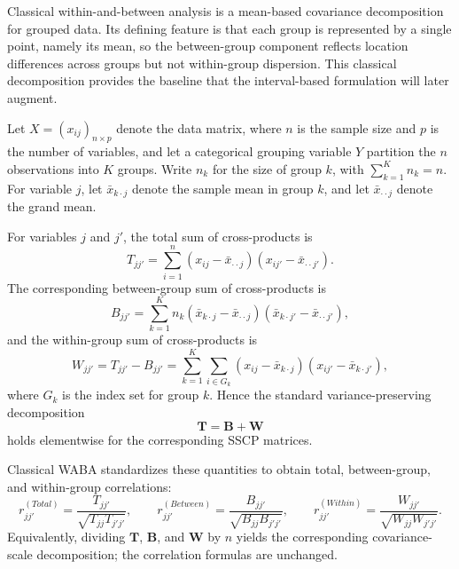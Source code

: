 \documentclass[preprint, times, 12pt, authoryear]{elsarticle}
\begin{document}
Classical within-and-between analysis is a mean-based covariance decomposition for grouped data. Its defining feature is that each group is represented by a single point, namely its mean, so the between-group component reflects location differences across groups but not within-group dispersion. This classical decomposition provides the baseline that the interval-based formulation will later augment.

Let $X=(x_{ij})_{n\times p}$ denote the data matrix, where $n$ is the sample size and $p$ is the number of variables, and let a categorical grouping variable $Y$ partition the $n$ observations into $K$ groups. Write $n_k$ for the size of group $k$, with $\sum_{k=1}^K n_k=n$. For variable $j$, let $\bar{x}_{k\cdot j}$ denote the sample mean in group $k$, and let $\bar{x}_{\cdot\cdot j}$ denote the grand mean.

For variables $j$ and $j'$, the total sum of cross-products is
\begin{equation}\label{eq:tss}
	T_{jj'}=\sum_{i=1}^n (x_{ij}-\bar{x}_{\cdot\cdot j})(x_{ij'}-\bar{x}_{\cdot\cdot j'}).
\end{equation}
The corresponding between-group sum of cross-products is
\begin{equation}\label{eq:bss}
	B_{jj'}=\sum_{k=1}^K n_k(\bar{x}_{k\cdot j}-\bar{x}_{\cdot\cdot j})(\bar{x}_{k\cdot j'}-\bar{x}_{\cdot\cdot j'}),
\end{equation}
and the within-group sum of cross-products is
\begin{equation}\label{eq:wss}
	W_{jj'}=T_{jj'}-B_{jj'}
	=\sum_{k=1}^K \sum_{i\in G_k}(x_{ij}-\bar{x}_{k\cdot j})(x_{ij'}-\bar{x}_{k\cdot j'}),
\end{equation}
where $G_k$ is the index set for group $k$. Hence the standard variance-preserving decomposition
\[
\mathbf{T}=\mathbf{B}+\mathbf{W}
\]
holds elementwise for the corresponding SSCP matrices.

Classical WABA standardizes these quantities to obtain total, between-group, and within-group correlations:
\begin{equation}\label{eq:classical_corrs}
	r_{jj'}^{(Total)}=\frac{T_{jj'}}{\sqrt{T_{jj}T_{j'j'}}},\qquad
	r_{jj'}^{(Between)}=\frac{B_{jj'}}{\sqrt{B_{jj}B_{j'j'}}},\qquad
	r_{jj'}^{(Within)}=\frac{W_{jj'}}{\sqrt{W_{jj}W_{j'j'}}}.
\end{equation}
Equivalently, dividing $\mathbf{T}$, $\mathbf{B}$, and $\mathbf{W}$ by $n$ yields the corresponding covariance-scale decomposition; the correlation formulas are unchanged.
\end{document}
